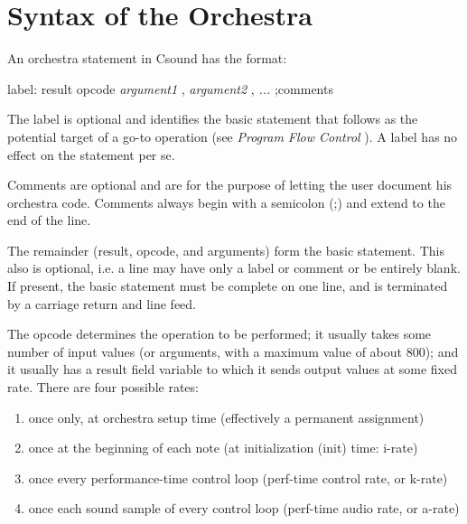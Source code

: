 \begin{comment}
\documentclass[10pt]{article}
\usepackage{fullpage, graphicx, url}
\setlength{\parskip}{1ex}
\setlength{\parindent}{0ex}
\title{Syntax of the Orchestra}



\begin{tabular}{ccc}
The Alternative Csound Reference Manual & & \\
Previous & &Next

\end{tabular}

\end{comment}
\section{Syntax of the Orchestra}


  An orchestra statement in Csound has the format: 


  label: result opcode \emph{argument1}
, \emph{argument2}
, \emph{...}
 ;comments 


  The label is optional and identifies the basic statement that follows as the potential target of a go-to operation (see \emph{Program Flow Control}
). A label has no effect on the statement per se. 


  Comments are optional and are for the purpose of letting the user document his orchestra code. Comments always begin with a semicolon (;) and extend to the end of the line. 


  The remainder (result, opcode, and arguments) form the basic statement. This also is optional, i.e. a line may have only a label or comment or be entirely blank. If present, the basic statement must be complete on one line, and is terminated by a carriage return and line feed. 


  The opcode determines the operation to be performed; it usually takes some number of input values (or arguments, with a maximum value of about 800); and it usually has a result field variable to which it sends output values at some fixed rate. There are four possible rates: 


 
\begin{enumerate}
\item 

 once only, at orchestra setup time (effectively a permanent assignment)

\item 

 once at the beginning of each note (at initialization (init) time: i-rate)

\item 

 once every performance-time control loop (perf-time control rate, or k-rate)

\item 

 once each sound sample of every control loop (perf-time audio rate, or a-rate)


\end{enumerate}
